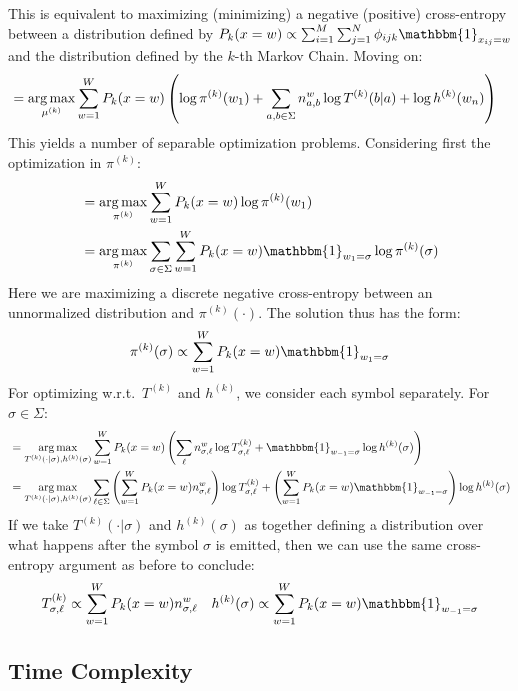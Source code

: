 \documentclass[10pt]{article}
\begin{document}
This is equivalent to maximizing (minimizing) a negative (positive) cross-entropy between a distribution defined by $P_k(x = w) \propto \sum_{i=1}^M \sum_{j=1}^N \phi_{ijk}\mathbbm{1}_{x_{ij} = w}$ and the distribution defined by the $k$-th Markov Chain. Moving on:
\begin{align}
    &= \operatorname*{arg\,max}_{\mu^{(k)}} \sum_{w=1}^W P_k(x = w) \left(\log \pi^{(k)}(w_1) + \sum_{a, b \in \Sigma} n_{a, b}^w \log T^{(k)}(b | a) + \log h^{(k)}(w_n)\right)
\end{align}
This yields a number of separable optimization problems. Considering first the optimization in $\pi^{(k)}$:
\begin{align}
    &= \argmax_{\pi^{(k)}} \sum_{w=1}^W P_k(x = w) \log \pi^{(k)}(w_1)\\
    &= \argmax_{\pi^{(k)}} \sum_{\sigma \in \Sigma} \sum_{w=1}^W P_k(x = w)\mathbbm{1}_{w_1 = \sigma} \log \pi^{(k)}(\sigma)
\end{align}
Here we are maximizing a discrete negative cross-entropy between an unnormalized distribution and $\pi^{(k)}(\cdot)$. The solution thus has the form:
\begin{align}
    \pi^{(k)}(\sigma) \propto \sum_{w=1}^W P_k(x = w)\mathbbm{1}_{w_1 = \sigma} 
\end{align}
For optimizing w.r.t.\ $T^{(k)}$ and $h^{(k)}$, we consider each symbol separately. For $\sigma \in \Sigma$:
\begin{align}
    &= \argmax_{T^{(k)}(\cdot | \sigma), h^{(k)}(\sigma)} \sum_{w=1}^W P_k(x = w) \left(\sum_{\ell} n_{\sigma,\ell}^w \log T^{(k)}_{\sigma, \ell} + \mathbbm{1}_{w_{-1}=\sigma}\log h^{(k)}(\sigma)\right)\\
    &= \argmax_{T^{(k)}(\cdot | \sigma), h^{(k)}(\sigma)} \sum_{\ell \in \Sigma} \left( \sum_{w=1}^W P_k(x = w)n^w_{\sigma,\ell}\right)\log T^{(k)}_{\sigma, \ell} + \left( \sum_{w=1}^W P_k(x = w)\mathbbm{1}_{w_{-1}=\sigma}\right)\log h^{(k)}(\sigma)
\end{align}
If we take $T^{(k)}(\cdot | \sigma)$ and $h^{(k)}(\sigma)$ as together defining a distribution over what happens after the symbol $\sigma$ is emitted, then we can use the same cross-entropy argument as before to conclude:
\begin{align}
    T^{(k)}_{\sigma, \ell} \propto \sum_{w=1}^W P_k(x = w)n_{\sigma,\ell}^w && h^{(k)}(\sigma) \propto \sum_{w=1}^W P_k(x = w)\mathbbm{1}_{w_{-1}=\sigma}
\end{align}

\subsection{Time Complexity}
\end{document}
